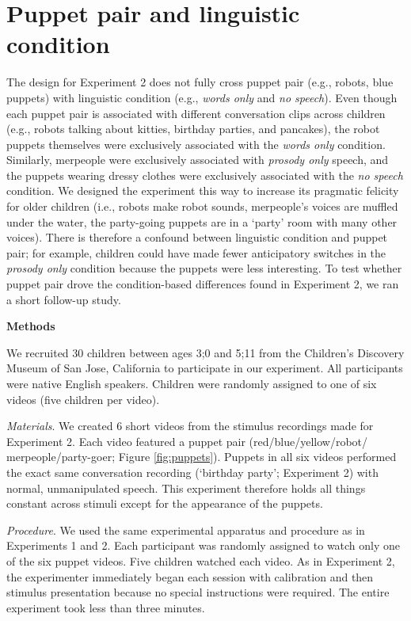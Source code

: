 \documentclass[authoryear, 12pt]{elsarticle}
\begin{document}
\section{Puppet pair and linguistic condition}
\label{sec:puppetconfound}
\setcounter{figure}{0}
The design for Experiment 2 does not fully cross puppet pair (e.g., robots, blue puppets) with linguistic condition (e.g., \textit{words only} and \textit{no speech}). Even though each puppet pair is associated with different conversation clips across children (e.g., robots talking about kitties, birthday parties, and pancakes), the robot puppets themselves were exclusively associated with the \textit{words only} condition. Similarly, merpeople were exclusively associated with \textit{prosody only} speech, and the puppets wearing dressy clothes were exclusively associated with the \textit{no speech} condition. We designed the experiment this way to increase its pragmatic felicity for older children (i.e., robots make robot sounds, merpeople's voices are muffled under the water, the party-going puppets are in a `party' room with many other voices). There is therefore a confound between linguistic condition and puppet pair; for example, children could have made fewer anticipatory switches in the \textit{prosody only} condition because the puppets were less interesting. To test whether puppet pair drove the condition-based differences found in Experiment 2, we ran a short follow-up study.

\newpage
\noindent \textbf{Methods}
\medskip

\noindent We recruited 30 children between ages 3;0 and 5;11 from the Children's Discovery Museum of San Jose, California to participate in our experiment. All participants were native English speakers. Children were randomly assigned to one of six videos (five children per video).

\medskip
\noindent \textit{Materials}. We created 6 short videos from the stimulus recordings made for Experiment 2. Each video featured a puppet pair (red/blue/yellow/robot/ merpeople/party-goer; Figure \ref{fig:puppets}). Puppets in all six videos performed the exact same conversation recording (`birthday party'; Experiment 2) with normal, unmanipulated speech. This experiment therefore holds all things constant across stimuli except for the appearance of the puppets.

\medskip
\noindent \textit{Procedure}. We used the same experimental apparatus and procedure as in Experiments 1 and 2. Each participant was randomly assigned to watch only one of the six puppet videos. Five children watched each video. As in Experiment 2, the experimenter immediately began each session with calibration and then stimulus presentation because no special instructions were required. The entire experiment took less than three minutes.
\end{document}
